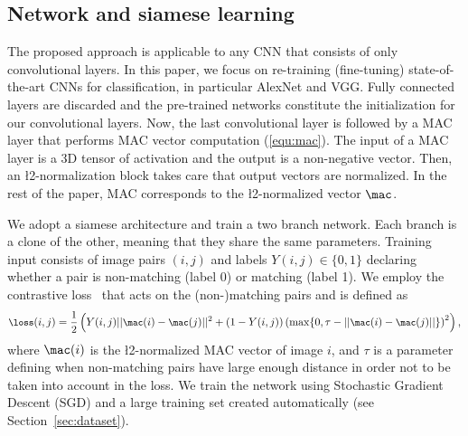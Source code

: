 \subsection{Network and siamese learning}
%
The proposed approach is applicable to any CNN that consists of only convolutional layers. 
In this paper, we focus on re-training (\ie fine-tuning) state-of-the-art CNNs for classification, in particular AlexNet and VGG. 
Fully connected layers are discarded and the pre-trained networks constitute the initialization for our convolutional layers.
Now, the last convolutional layer is followed by a MAC layer that performs MAC vector computation (\ref{equ:mac}).
The input of a MAC layer is a 3D tensor of activation and the output is a non-negative vector. 
Then, an \l2-normalization block takes care that output vectors are normalized. 
In the rest of the paper, MAC corresponds to the \l2-normalized vector $\mac$.

We adopt a siamese architecture and train a two branch network. 
Each branch is a clone of the other, meaning that they share the same parameters. 
Training input consists of image pairs $(i,j)$ and labels $Y(i,j)\in \{0, 1\}$ declaring whether a pair is non-matching (label 0) or matching (label 1). 
We employ the contrastive loss~\cite{CHL05} that acts on the (non-)matching pairs and is defined as
%
\begin{equation}
\small
\loss(i,j) = \frac{1}{2}\left(Y(i,j) ||\mac(i)-\mac(j)||^2 + \left(1-Y(i,j)\right) \left(\max\{0, \tau - ||\mac(i)-\mac(j)||\}\right)^2\right),
\end{equation}
%
where $\mac(i)$ is the \l2-normalized MAC vector of image $i$, and $\tau$ is a parameter defining when non-matching pairs have large enough distance in order not to be taken into account in the loss.
We train the network using Stochastic Gradient Descent (SGD) and a large training set created automatically (see Section~\ref{sec:dataset}). 
%
